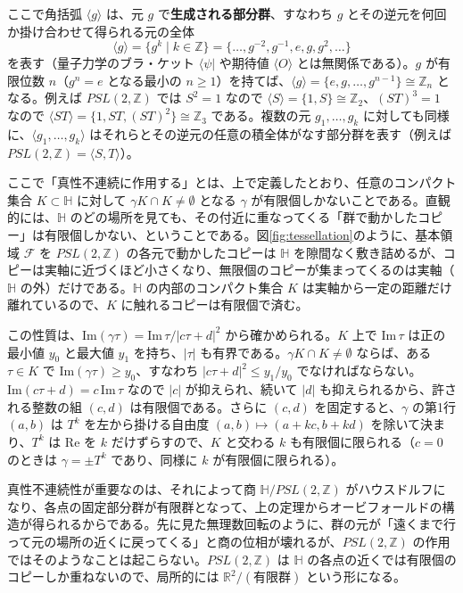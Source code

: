 \documentclass[uplatex, dvipdfmx, book]{jsbook}
\begin{document}
ここで角括弧 $\langle g \rangle$ は、元 $g$ で\textbf{生成される部分群}、すなわち $g$ とその逆元を何回か掛け合わせて得られる元の全体
\begin{equation*}
    \langle g \rangle = \{ g^k \mid k \in \mathbb{Z} \} = \{ \dots, g^{-2}, g^{-1}, e, g, g^2, \dots \}
\end{equation*}
を表す（量子力学のブラ・ケット $\langle \psi |$ や期待値 $\langle O \rangle$ とは無関係である）。$g$ が有限位数 $n$（$g^n = e$ となる最小の $n \ge 1$）を持てば、$\langle g \rangle = \{ e, g, \dots, g^{n-1} \} \cong \mathbb{Z}_n$ となる。例えば $PSL(2, \mathbb{Z})$ では $S^2 = 1$ なので $\langle S \rangle = \{ 1, S \} \cong \mathbb{Z}_2$、$(ST)^3 = 1$ なので $\langle ST \rangle = \{ 1, ST, (ST)^2 \} \cong \mathbb{Z}_3$ である。複数の元 $g_1, \dots, g_k$ に対しても同様に、$\langle g_1, \dots, g_k \rangle$ はそれらとその逆元の任意の積全体がなす部分群を表す（例えば $PSL(2, \mathbb{Z}) = \langle S, T \rangle$）。

ここで「真性不連続に作用する」とは、上で定義したとおり、任意のコンパクト集合 $K \subset \mathbb{H}$ に対して $\gamma K \cap K \neq \emptyset$ となる $\gamma$ が有限個しかないことである。直観的には、$\mathbb{H}$ のどの場所を見ても、その付近に重なってくる「群で動かしたコピー」は有限個しかない、ということである。図\ref{fig:tessellation}のように、基本領域 $\mathcal{F}$ を $PSL(2, \mathbb{Z})$ の各元で動かしたコピーは $\mathbb{H}$ を隙間なく敷き詰めるが、コピーは実軸に近づくほど小さくなり、無限個のコピーが集まってくるのは実軸（$\mathbb{H}$ の外）だけである。$\mathbb{H}$ の内部のコンパクト集合 $K$ は実軸から一定の距離だけ離れているので、$K$ に触れるコピーは有限個で済む。

この性質は、$\mathrm{Im}(\gamma\tau) = \mathrm{Im}\,\tau / |c\tau + d|^2$ から確かめられる。$K$ 上で $\mathrm{Im}\,\tau$ は正の最小値 $y_0$ と最大値 $y_1$ を持ち、$|\tau|$ も有界である。$\gamma K \cap K \neq \emptyset$ ならば、ある $\tau \in K$ で $\mathrm{Im}(\gamma\tau) \ge y_0$、すなわち $|c\tau + d|^2 \le y_1/y_0$ でなければならない。$\mathrm{Im}(c\tau+d) = c\,\mathrm{Im}\,\tau$ なので $|c|$ が抑えられ、続いて $|d|$ も抑えられるから、許される整数の組 $(c, d)$ は有限個である。さらに $(c, d)$ を固定すると、$\gamma$ の第1行 $(a, b)$ は $T^k$ を左から掛ける自由度 $(a, b) \mapsto (a + kc, b + kd)$ を除いて決まり、$T^k$ は $\mathrm{Re}$ を $k$ だけずらすので、$K$ と交わる $k$ も有限個に限られる（$c = 0$ のときは $\gamma = \pm T^k$ であり、同様に $k$ が有限個に限られる）。

真性不連続性が重要なのは、それによって商 $\mathbb{H}/PSL(2,\mathbb{Z})$ がハウスドルフになり、各点の固定部分群が有限群となって、上の定理からオービフォールドの構造が得られるからである。先に見た無理数回転のように、群の元が「遠くまで行って元の場所の近くに戻ってくる」と商の位相が壊れるが、$PSL(2,\mathbb{Z})$ の作用ではそのようなことは起こらない。$PSL(2, \mathbb{Z})$ は $\mathbb{H}$ の各点の近くでは有限個のコピーしか重ねないので、局所的には $\mathbb{R}^2/(\text{有限群})$ という形になる。
\end{document}
